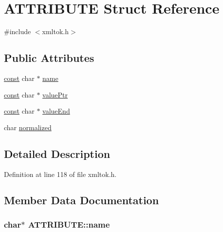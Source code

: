 \hypertarget{struct_a_t_t_r_i_b_u_t_e}{}\section{A\+T\+T\+R\+I\+B\+U\+TE Struct Reference}
\label{struct_a_t_t_r_i_b_u_t_e}


{\ttfamily \#include $<$xmltok.\+h$>$}

\subsection*{Public Attributes}
\begin{DoxyCompactItemize}
\item 
\hyperlink{getopt1_8c_a2c212835823e3c54a8ab6d95c652660e}{const} char $\ast$ \hyperlink{struct_a_t_t_r_i_b_u_t_e_a93c42f62f5225db49d1c8fa995df0b98}{name}
\item 
\hyperlink{getopt1_8c_a2c212835823e3c54a8ab6d95c652660e}{const} char $\ast$ \hyperlink{struct_a_t_t_r_i_b_u_t_e_aa74f5eb3f75d6a6e28fbf0c020bbe021}{value\+Ptr}
\item 
\hyperlink{getopt1_8c_a2c212835823e3c54a8ab6d95c652660e}{const} char $\ast$ \hyperlink{struct_a_t_t_r_i_b_u_t_e_ad551901b9645e6abea66612eda5ac49e}{value\+End}
\item 
char \hyperlink{struct_a_t_t_r_i_b_u_t_e_ab58ed5e3d2fd99385f6f7166ffead55a}{normalized}
\end{DoxyCompactItemize}


\subsection{Detailed Description}


Definition at line 118 of file xmltok.\+h.



\subsection{Member Data Documentation}
\subsubsection[{\texorpdfstring{name}{name}}]{ char$\ast$ A\+T\+T\+R\+I\+B\+U\+T\+E\+::name}\hypertarget{struct_a_t_t_r_i_b_u_t_e_a93c42f62f5225db49d1c8fa995df0b98}{}\label{struct_a_t_t_r_i_b_u_t_e_a93c42f62f5225db49d1c8fa995df0b98}


